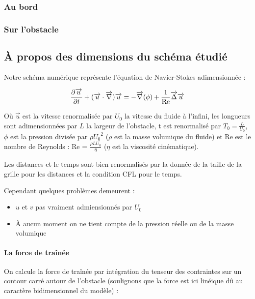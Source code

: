 		\subsubsection{Au bord}
		
		\subsubsection{Sur l'obstacle}




	\subsection{À propos des dimensions du schéma étudié}
	
		Notre schéma numérique représente l'équation de Navier-Stokes 		adimensionnée :

		\begin{equation}
			\frac{\partial \overrightarrow{u}}{\partial t} + (\overrightarrow{u} \cdot 	\overrightarrow{\nabla}) \overrightarrow{u} = - \overrightarrow{\nabla} (\phi) + \frac{1}{\mathrm{Re}} \overrightarrow{\Delta} \overrightarrow{u}
			\label{NS}
		\end{equation}
	
		Où $\overrightarrow{u}$ est la vitesse renormalisée par $U_0$ la vitesse du fluide à l'infini,
		les longueurs sont adimensionnées par $L$ la largeur de l'obstacle,
		t est renormalisé par $T_0 = \frac{L}{U_0}$,
		$\phi$ est la pression divisée par $\rho {U_0}^2$ ($\rho$ est la masse volumique du fluide)
		et Re est le nombre de Reynolds : Re = $\frac{\rho L U_0}{\eta}$ ($\eta$ est la viscosité cinématique).
	    
	   
		Les distances et le temps sont bien renormalisés par la donnée de la taille de la grille pour les distances et la condition CFL pour le temps.
	
	    
		Cependant quelques problèmes demeurent : 
		\begin{itemize}
			\item $u$ et $v$ pas vraiment  admiensionnés par $U_0$ 
			\item À aucun moment on ne tient compte de la pression réelle ou de la masse volumique
		\end{itemize}
	
		\paragraph{La force de traînée}

		On calcule la force de traînée par intégration du tenseur des contraintes sur un contour carré autour de l'obstacle (soulignons que la force est ici linéique dû au caractère bidimensionnel du modèle) :
	
